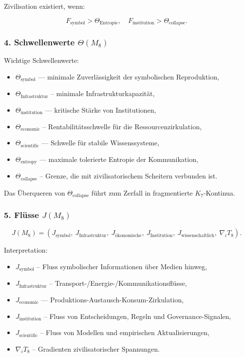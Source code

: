 Zivilisation existiert, wenn:

\[
F_{\mathrm{symbol}} > \Theta_{\mathrm{Entropie}},
\quad
F_{\mathrm{institution}} > \Theta_{\mathrm{collapse}}.
\]

\subsubsection*{4. Schwellenwerte \texorpdfstring{$\Theta(M_8)$}{\Theta(M_8)}}

Wichtige Schwellenwerte:

\begin{itemize}
    \item $\Theta_{\mathrm{symbol}}$ — minimale Zuverlässigkeit der symbolischen Reproduktion,
    \item $\Theta_{\mathrm{Infrastruktur}}$ – minimale Infrastrukturkapazität,
    \item $\Theta_{\mathrm{institution}}$ — kritische Stärke von Institutionen,
    \item $\Theta_{\mathrm{economic}}$ – Rentabilitätsschwelle für die Ressourcenzirkulation,
    \item $\Theta_{\mathrm{scientific}}$ — Schwelle für stabile Wissenssysteme,
    \item $\Theta_{\mathrm{entropy}}$ — maximale tolerierte Entropie der Kommunikation,
    \item $\Theta_{\mathrm{collapse}}$ – Grenze, die mit zivilisatorischem Scheitern verbunden ist.
\end{itemize}

Das Überqueren von $\Theta_{\mathrm{collapse}}$ führt zum Zerfall in fragmentierte $K_7$-Kontinua.

\subsubsection*{5. Flüsse \texorpdfstring{$J(M_8)$}{J(M_8)}}

\[
J(M_8)=
(J_{\mathrm{symbol}},\
J_{\mathrm{Infrastruktur}},\
J_{\mathrm{ökonomische}},\
J_{\mathrm{Institution}},\
J_{\mathrm{wissenschaftlich}},\
\nabla_i T_8).
\]

Interpretation:

\begin{itemize}
    \item $J_{\mathrm{symbol}}$ – Fluss symbolischer Informationen über Medien hinweg,
    \item $J_{\mathrm{Infrastruktur}}$ – Transport-/Energie-/Kommunikationsflüsse,
    \item $J_{\mathrm{economic}}$ — Produktions-Austausch-Konsum-Zirkulation,
    \item $J_{\mathrm{institution}}$ – Fluss von Entscheidungen, Regeln und Governance-Signalen,
    \item $J_{\mathrm{scientific}}$ – Fluss von Modellen und empirischen Aktualisierungen,
    \item $\nabla_i T_8$ – Gradienten zivilisatorischer Spannungen.
\end{itemize}

